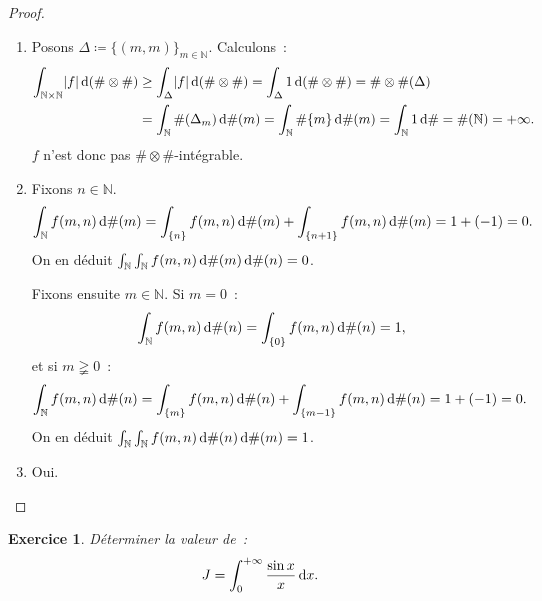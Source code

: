 \documentclass{article}
\newtheorem{ex}{Exercice}[section]
\newcommand{\pinfty}{{+\infty}}
\newcommand{\N}{{\mathbb N}}
\begin{document}
\begin{proof}~
\begin{enumerate}
	\item Posons $\Delta \coloneqq \{(m, m)\}_{m \in \N}$. Calculons~:
	\begin{align*}
		\int_{\N \times \N}\abs f\dif\,(\# \otimes \#) &\geq \int_\Delta\abs f\dif\,(\# \otimes \#) = \int_\Delta 1 \dif\,(\# \otimes \#) = \# \otimes \#(\Delta) \\
			&= \int_\N\#(\Delta_m)\dif\#(m) = \int_\N\#\{m\}\dif\#(m) = \int_\N1\dif\# = \#(\N) = \pinfty.
	\end{align*}
	$f$ n'est donc pas $\# \otimes \#$-intégrable.

	\item Fixons $n \in \N$.
	\[\int_\N f(m, n)\dif\#(m) = \int_{\{n\}}f(m, n)\dif\#(m) + \int_{\{n+1\}}f(m, n)\dif\#(m) = 1 + (-1) = 0.\]
	On en déduit $\int_\N\int_\N f(m,n)\dif\#(m)\dif\#(n) = 0$.

	Fixons ensuite $m \in \N$. Si $m = 0$~:
	\[\int_\N f(m, n)\dif\#(n) = \int_{\{0\}}f(m, n)\dif\#(n) = 1,\]
	et si $m \gneqq 0$~:
	\[\int_\N f(m, n)\dif\#(n) = \int_{\{m\}}f(m, n)\dif\#(n) + \int_{\{m-1\}}f(m, n)\dif\#(n) = 1 + (-1) = 0.\]
	On en déduit $\int_\N\int_\N f(m, n)\dif\#(n)\dif\#(m) = 1$.

	\item Oui.
\end{enumerate}
\end{proof}

\begin{ex} Déterminer la valeur de~:
\[J = \int_0^\pinfty\frac {\sin x}x\dif x.\]
\end{ex}
\end{document}
